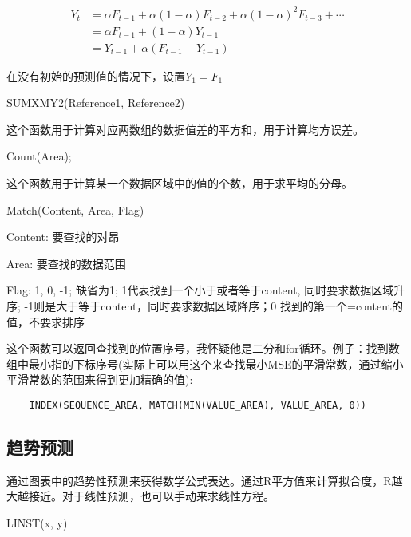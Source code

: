 \documentclass[10pt, a4paper]{article}
\begin{document}
        \begin{align*}
            Y_t &= \alpha F_{t - 1} + \alpha(1 - \alpha) F_{t - 2} + \alpha(1 - \alpha)^2 F_{t - 3} + \cdots \\
            & = \alpha F_{t - 1} + (1 - \alpha)Y_{t - 1} \\
            & = Y_{t - 1} + \alpha(F_{t-1} - Y_{t - 1})  
        \end{align*}

        在没有初始的预测值的情况下，设置$Y_1 = F_1$

        \begin{center}
            SUMXMY2(Reference1, Reference2)
        \end{center}
        
        这个函数用于计算对应两数组的数据值差的平方和，用于计算均方误差。

        \begin{center}
            Count(Area);
        \end{center}
        
        这个函数用于计算某一个数据区域中的值的个数，用于求平均的分母。

        \begin{center}
            Match(Content, Area, Flag)
        \end{center}

        \quad Content: 要查找的对昂
        
        \quad Area: 要查找的数据范围
        
        \quad Flag: 1, 0, -1; 缺省为1; 1代表找到一个小于或者等于content, 同时要求数据区域升序; -1则是大于等于content，同时要求数据区域降序；0 找到的第一个=content的值，不要求排序

        这个函数可以返回查找到的位置序号，我怀疑他是二分和for循环。例子：找到数组中最小指的下标序号(实际上可以用这个来查找最小MSE的平滑常数，通过缩小平滑常数的范围来得到更加精确的值): 
\begin{lstlisting}
    INDEX(SEQUENCE_AREA, MATCH(MIN(VALUE_AREA), VALUE_AREA, 0)) 
\end{lstlisting}

    \subsection{趋势预测}
        通过图表中的趋势性预测来获得数学公式表达。通过R平方值来计算拟合度，R越大越接近。对于线性预测，也可以手动来求线性方程。 
        \begin{center}
            LINST(x, y)
        \end{center}
\end{document}
